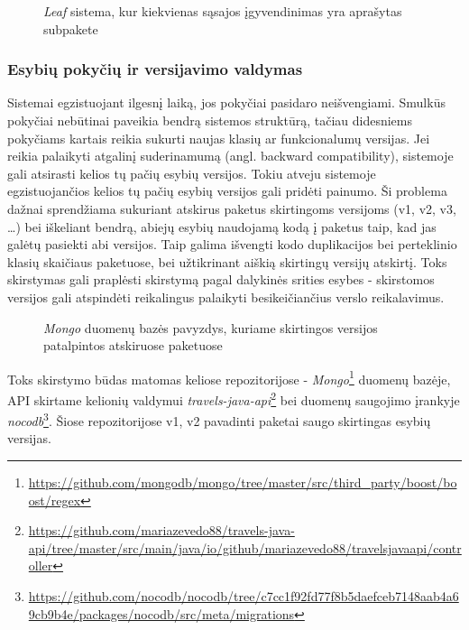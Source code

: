 \begin{figure}[H]
    \snugshade
    \endsnugshade
    \caption{\textit{Leaf} sistema, kur kiekvienas sąsajos įgyvendinimas yra aprašytas subpakete}
\end{figure}

\subsubsection{Esybių pokyčių ir versijavimo valdymas}
Sistemai egzistuojant ilgesnį laiką, jos pokyčiai pasidaro neišvengiami.
Smulkūs pokyčiai nebūtinai paveikia bendrą sistemos struktūrą, tačiau
didesniems pokyčiams kartais reikia sukurti naujas klasių ar funkcionalumų versijas. Jei reikia palaikyti atgalinį
suderinamumą (angl. backward compatibility), sistemoje gali atsirasti kelios tų pačių esybių versijos.
Tokiu atveju sistemoje egzistuojančios kelios tų pačių esybių versijos gali pridėti painumo.
Ši problema dažnai sprendžiama sukuriant atskirus paketus skirtingoms
versijoms (v1, v2, v3, \ldots) bei iškeliant bendrą, abiejų esybių naudojamą kodą į paketus taip, kad jas galėtų pasiekti abi versijos.
Taip galima išvengti kodo duplikacijos bei perteklinio klasių skaičiaus paketuose, bei užtikrinant aiškią skirtingų versijų
atskirtį. Toks skirstymas gali praplėsti skirstymą pagal dalykinės srities esybes - skirstomos versijos gali atspindėti reikalingus
palaikyti besikeičiančius verslo reikalavimus.
\begin{figure}[H]
    \snugshade
    \endsnugshade
    \caption{\textit{Mongo} duomenų bazės pavyzdys, kuriame skirtingos versijos patalpintos atskiruose paketuose}
\end{figure}
Toks skirstymo būdas matomas keliose repozitorijose - \textit{Mongo}\footnote{\url{https://github.com/mongodb/mongo/tree/master/src/third_party/boost/boost/regex}} duomenų bazėje,
API skirtame kelionių valdymui \textit{travels-java-api}\footnote{\url{https://github.com/mariazevedo88/travels-java-api/tree/master/src/main/java/io/github/mariazevedo88/travelsjavaapi/controller}}
 bei duomenų saugojimo įrankyje \textit{nocodb}\footnote{\url{https://github.com/nocodb/nocodb/tree/c7cc1f92fd77f8b5daefceb7148aab4a69cb9b4e/packages/nocodb/src/meta/migrations}}.
Šiose repozitorijose v1, v2 pavadinti paketai saugo skirtingas esybių versijas.

